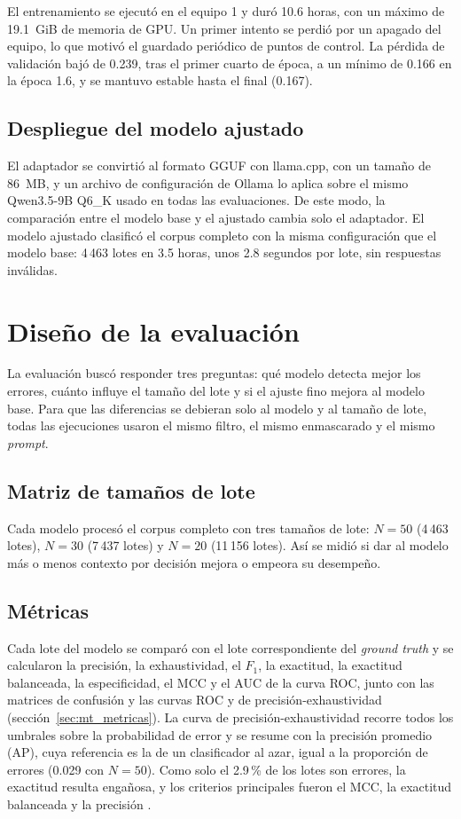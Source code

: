 El entrenamiento se ejecutó en el equipo 1 y duró 10.6 horas, con un máximo de 19.1~GiB de memoria de GPU. Un primer intento se perdió por un apagado del equipo, lo que motivó el guardado periódico de puntos de control. La pérdida de validación bajó de 0.239, tras el primer cuarto de época, a un mínimo de 0.166 en la época 1.6, y se mantuvo estable hasta el final (0.167).

\subsection{Despliegue del modelo ajustado}

El adaptador se convirtió al formato GGUF con llama.cpp, con un tamaño de 86~MB, y un archivo de configuración de Ollama lo aplica sobre el mismo Qwen3.5-9B Q6\_K usado en todas las evaluaciones. De este modo, la comparación entre el modelo base y el ajustado cambia solo el adaptador. El modelo ajustado clasificó el corpus completo con la misma configuración que el modelo base: 4\,463 lotes en 3.5 horas, unos 2.8 segundos por lote, sin respuestas inválidas.

\section{Diseño de la evaluación}\label{sec:met_evaluacion}

La evaluación buscó responder tres preguntas: qué modelo detecta mejor los errores, cuánto influye el tamaño del lote y si el ajuste fino mejora al modelo base. Para que las diferencias se debieran solo al modelo y al tamaño de lote, todas las ejecuciones usaron el mismo filtro, el mismo enmascarado y el mismo \textit{prompt}.

\subsection{Matriz de tamaños de lote}

Cada modelo procesó el corpus completo con tres tamaños de lote: $N = 50$ (4\,463 lotes), $N = 30$ (7\,437 lotes) y $N = 20$ (11\,156 lotes). Así se midió si dar al modelo más o menos contexto por decisión mejora o empeora su desempeño.

\subsection{Métricas}\label{subsec:met_metricas}

Cada lote del modelo se comparó con el lote correspondiente del \textit{ground truth} y se calcularon la precisión, la exhaustividad, el $F_1$, la exactitud, la exactitud balanceada, la especificidad, el MCC y el AUC de la curva ROC, junto con las matrices de confusión y las curvas ROC y de precisión-exhaustividad (sección~\ref{sec:mt_metricas}). La curva de precisión-exhaustividad recorre todos los umbrales sobre la probabilidad de error y se resume con la precisión promedio (AP), cuya referencia es la de un clasificador al azar, igual a la proporción de errores (0.029 con $N = 50$). Como solo el 2.9\,\% de los lotes son errores, la exactitud resulta engañosa, y los criterios principales fueron el MCC, la exactitud balanceada y la precisión \cite{chicco2020_mcc}.

